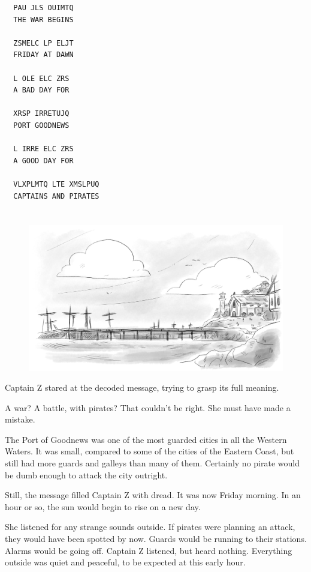 \documentclass[12pt]{extbook}
\begin{document}
  \begin{lstlisting}
  PAU JLS OUIMTQ
  THE WAR BEGINS
  
  ZSMELC LP ELJT
  FRIDAY AT DAWN
  
  L OLE ELC ZRS
  A BAD DAY FOR
  
  XRSP IRRETUJQ
  PORT GOODNEWS
  
  L IRRE ELC ZRS
  A GOOD DAY FOR
  
  VLXPLMTQ LTE XMSLPUQ
  CAPTAINS AND PIRATES
  \end{lstlisting}
  
  \section{}\label{section-36}
  
  \begin{figure}[htbp]
  \centering
  \includegraphics{img/port_of_goodnews.png}
  \caption{}
  \end{figure}
  
  Captain Z stared at the decoded message, trying to grasp its full
  meaning.
  
  A war? A battle, with pirates? That couldn't be right. She must have
  made a mistake.
  
  The Port of Goodnews was one of the most guarded cities in all the
  Western Waters. It was small, compared to some of the cities of the
  Eastern Coast, but still had more guards and galleys than many of them.
  Certainly no pirate would be dumb enough to attack the city outright.
  
  Still, the message filled Captain Z with dread. It was now Friday
  morning. In an hour or so, the sun would begin to rise on a new day.
  
  She listened for any strange sounds outside. If pirates were planning an
  attack, they would have been spotted by now. Guards would be running to
  their stations. Alarms would be going off. Captain Z listened, but heard
  nothing. Everything outside was quiet and peaceful, to be expected at
  this early hour.
  
\end{document}
